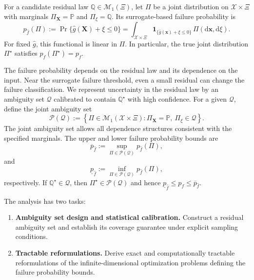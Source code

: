 \documentclass[review,11pt,3p,authoryear,nopreprintline]{elsarticle}
\begin{document}
For a candidate residual law $\mathbb Q\in\mathcal M_1(\Xi)$, let $\Pi$ be a joint distribution on $\mathcal X\times\Xi$ with marginals $\Pi_{\bm X}=\mathbb P$ and $\Pi_\xi=\mathbb Q$. Its surrogate-based failure probability is
\begin{equation}
  p_{\hat f}(\Pi):=\Pr\{\hat g(\bm X)+\xi\le0\}=\int_{\mathcal X\times\Xi}\mathbf 1_{\{\hat g(\bm x)+\xi\le0\}}\,\Pi(\mathrm d\bm x,\mathrm d\xi).
  \label{eq-surrogate-failure-probability}
\end{equation}
For fixed $\hat g$, this functional is linear in $\Pi$. In particular, the true joint distribution $\Pi^\star$ satisfies $p_{\hat f}(\Pi^\star)=p_f$.

The failure probability depends on the residual law and its dependence on the input. Near the surrogate failure threshold, even a small residual can change the failure classification. We represent uncertainty in the residual law by an ambiguity set $\mathcal Q$ calibrated to contain $\mathbb Q^\star$ with high confidence. For a given $\mathcal Q$, define the joint ambiguity set
\[
  \mathcal P(\mathcal Q) :=\left\{\Pi\in\mathcal M_1(\mathcal X\times\Xi):\Pi_{\bm X}=\mathbb P,\ \Pi_\xi\in\mathcal Q\right\}.
\]
The joint ambiguity set allows all dependence structures consistent with the specified marginals. The upper and lower failure probability bounds are
\begin{equation}
  \overline p_{\hat f}:=\sup_{\Pi\in\mathcal P(\mathcal Q)}p_{\hat f}(\Pi),
  \label{eq-upper-bound}
\end{equation}
and
\begin{equation}
  \underline p_{\hat f}:=\inf_{\Pi\in\mathcal P(\mathcal Q)}p_{\hat f}(\Pi),
  \label{eq-lower-bound}
\end{equation}
respectively. If $\mathbb Q^\star\in\mathcal Q$, then $\Pi^\star\in\mathcal P(\mathcal Q)$ and hence $\underline p_{\hat f}\le p_f\le\overline p_{\hat f}$.

The analysis has two tasks:
\begin{enumerate}
  \item \textbf{Ambiguity set design and statistical calibration.} Construct a residual ambiguity set and establish its coverage guarantee under explicit sampling conditions.
  \item \textbf{Tractable reformulations.} Derive exact and computationally tractable reformulations of the infinite-dimensional optimization problems defining the failure probability bounds.
\end{enumerate}
\end{document}
